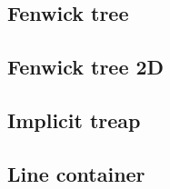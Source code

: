 
\subsection{Fenwick tree}

\subsection{Fenwick tree 2D}

\subsection{Implicit treap}

\subsection{Line container}
